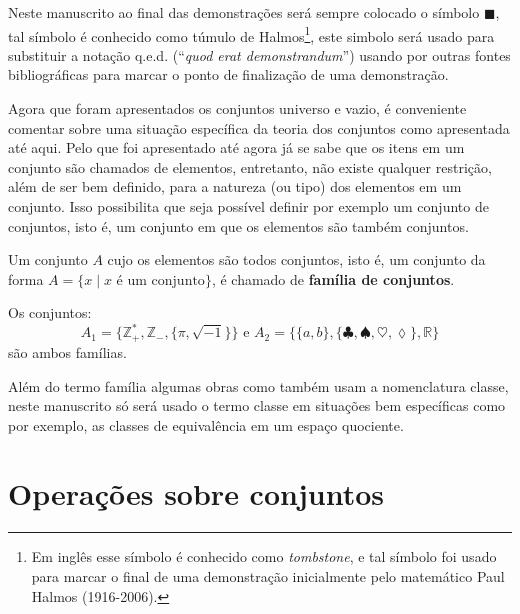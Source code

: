 \begin{rema}
	Neste manuscrito ao final das demonstrações será sempre colocado o símbolo $\blacksquare$, tal símbolo é conhecido como túmulo de Halmos\footnote{Em inglês esse símbolo é conhecido como \textit{tombstone}, e tal símbolo foi usado para marcar o final de uma demonstração inicialmente pelo matemático Paul Halmos (1916-2006).}, este simbolo será usado para substituir a notação q.e.d. (``\textit{quod erat demonstrandum}'') usando por outras fontes bibliográficas para marcar o ponto de finalização de uma demonstração. 
\end{rema}

Agora que foram apresentados os conjuntos universo e vazio, é conveniente comentar sobre uma situação específica da teoria dos conjuntos como apresentada até aqui. Pelo que foi apresentado até agora já se sabe que os itens em um conjunto são chamados de elementos, entretanto, não existe qualquer restrição, além de ser bem definido, para a natureza (ou tipo) dos elementos em um conjunto. Isso possibilita que seja possível definir por exemplo um conjunto de conjuntos, isto é, um conjunto em que os elementos são também conjuntos.

\begin{definition}[Família]\label{def:Familia}
	Um conjunto $A$ cujo os elementos são todos conjuntos, isto é, um conjunto da forma $A = \{x \mid x \mbox{ é um conjunto}\}$, é chamado de \textbf{família de conjuntos}.
\end{definition}

\begin{exem}\label{exe:Familia}
	Os conjuntos: 
	$$A_1 = \{\mathbb{Z}^*_+, \mathbb{Z}_-, \{\pi, \sqrt{-1}\}\} \mbox{ e } A_2 = \{\{a, b\}, \{\clubsuit, \spadesuit, \heartsuit, \lozenge\}, \mathbb{R}\}$$
	são ambos famílias. 
\end{exem}

\begin{rema}
	Além do termo família algumas obras como \cite{lipschutz1978-TC} também usam a nomenclatura classe, neste manuscrito só será usado o termo classe em situações bem específicas como por exemplo, as classes de equivalência em um espaço quociente.
\end{rema}

\section{Operações sobre conjuntos}\label{sec:OperacoesConjuntos}

